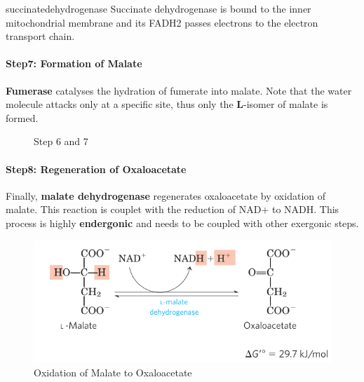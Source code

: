 \documentclass[../main.tex]{subfiles}
\begin{document}
\begin{RemarkWithTitel}{\gls{succinatedehydrogenase}}
	Succinate dehydrogenase is bound to the inner mitochondrial membrane and its FADH2 passes electrons to the electron transport chain. 
\end{RemarkWithTitel}


\paragraph{Step7: Formation of Malate}

\textbf{Fumerase} catalyses the hydration of fumerate into malate. Note that the water molecule attacks only at a specific site, thus only the \textbf{L}-isomer of malate is formed.

\begin{figure}[H]
	\centering
	\caption{Step 6 and 7}
\end{figure}


\paragraph{Step8: Regeneration of Oxaloacetate}
Finally, \textbf{malate dehydrogenase} regenerates oxaloacetate by oxidation of malate. This reaction is couplet with the reduction of NAD+ to NADH. This process is highly \textbf{endergonic} and needs to be coupled with other exergonic steps.  

\begin{figure}[H]
	\centering
	\includegraphics[height = 4 cm]{TCAS8}
	\caption{Oxidation of Malate to Oxaloacetate}
\end{figure}
\end{document}
